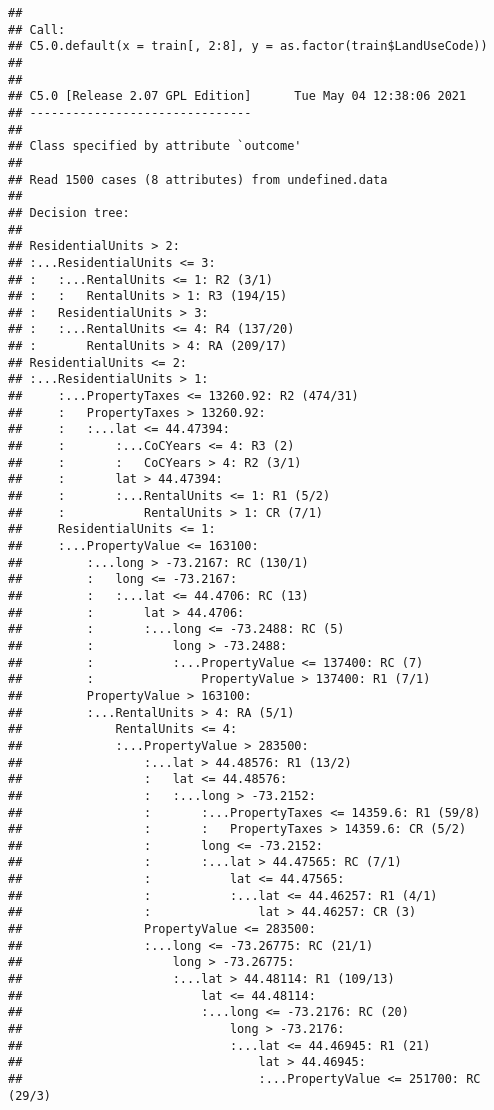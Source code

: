 \documentclass[
]{article}
\begin{document}
\begin{verbatim}
## 
## Call:
## C5.0.default(x = train[, 2:8], y = as.factor(train$LandUseCode))
## 
## 
## C5.0 [Release 2.07 GPL Edition]      Tue May 04 12:38:06 2021
## -------------------------------
## 
## Class specified by attribute `outcome'
## 
## Read 1500 cases (8 attributes) from undefined.data
## 
## Decision tree:
## 
## ResidentialUnits > 2:
## :...ResidentialUnits <= 3:
## :   :...RentalUnits <= 1: R2 (3/1)
## :   :   RentalUnits > 1: R3 (194/15)
## :   ResidentialUnits > 3:
## :   :...RentalUnits <= 4: R4 (137/20)
## :       RentalUnits > 4: RA (209/17)
## ResidentialUnits <= 2:
## :...ResidentialUnits > 1:
##     :...PropertyTaxes <= 13260.92: R2 (474/31)
##     :   PropertyTaxes > 13260.92:
##     :   :...lat <= 44.47394:
##     :       :...CoCYears <= 4: R3 (2)
##     :       :   CoCYears > 4: R2 (3/1)
##     :       lat > 44.47394:
##     :       :...RentalUnits <= 1: R1 (5/2)
##     :           RentalUnits > 1: CR (7/1)
##     ResidentialUnits <= 1:
##     :...PropertyValue <= 163100:
##         :...long > -73.2167: RC (130/1)
##         :   long <= -73.2167:
##         :   :...lat <= 44.4706: RC (13)
##         :       lat > 44.4706:
##         :       :...long <= -73.2488: RC (5)
##         :           long > -73.2488:
##         :           :...PropertyValue <= 137400: RC (7)
##         :               PropertyValue > 137400: R1 (7/1)
##         PropertyValue > 163100:
##         :...RentalUnits > 4: RA (5/1)
##             RentalUnits <= 4:
##             :...PropertyValue > 283500:
##                 :...lat > 44.48576: R1 (13/2)
##                 :   lat <= 44.48576:
##                 :   :...long > -73.2152:
##                 :       :...PropertyTaxes <= 14359.6: R1 (59/8)
##                 :       :   PropertyTaxes > 14359.6: CR (5/2)
##                 :       long <= -73.2152:
##                 :       :...lat > 44.47565: RC (7/1)
##                 :           lat <= 44.47565:
##                 :           :...lat <= 44.46257: R1 (4/1)
##                 :               lat > 44.46257: CR (3)
##                 PropertyValue <= 283500:
##                 :...long <= -73.26775: RC (21/1)
##                     long > -73.26775:
##                     :...lat > 44.48114: R1 (109/13)
##                         lat <= 44.48114:
##                         :...long <= -73.2176: RC (20)
##                             long > -73.2176:
##                             :...lat <= 44.46945: R1 (21)
##                                 lat > 44.46945:
##                                 :...PropertyValue <= 251700: RC (29/3)

\end{verbatim}
\end{document}
